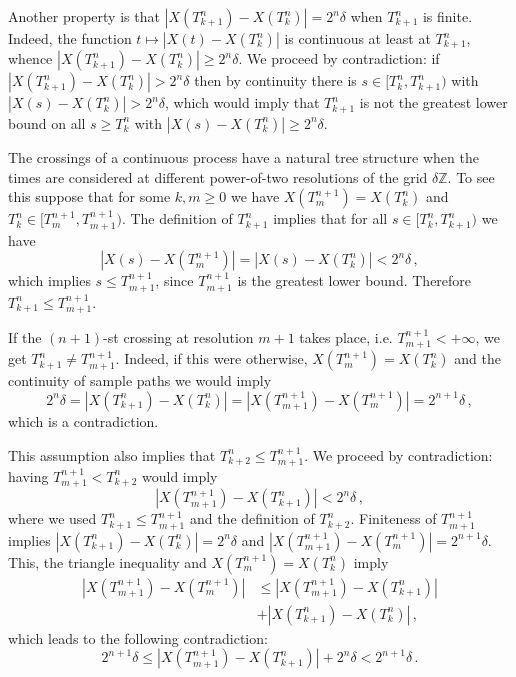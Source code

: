 \documentclass[a4paper]{article}
\begin{document}
Another property is that $|X(T_{k+1}^n) - X(T_k^n)| = 2^n\delta$ when $T_{k+1}^n$
is finite. Indeed, the function $t \mapsto |X(t) - X(T_k^n)|$ is continuous at least
at $T_{k+1}^n$, whence $|X(T_{k+1}^n) - X(T_k^n)| \geq 2^n\delta$. We proceed by
contradiction: if $|X(T_{k+1}^n) - X(T_k^n)| > 2^n\delta$ then by continuity there
is $s\in [T_k^n, T_{k+1}^n)$ with $|X(s) - X(T_k^n)| > 2^n\delta$, which would
imply that $T_{k+1}^n$ is not the greatest lower bound on all $s\geq T_k^n$ with
$|X(s)-X(T_k^n)| \geq 2^n\delta$.


The crossings of a continuous process have a natural tree structure when the times
are considered at different power-of-two resolutions of the grid $\delta \mathbb{Z}$.
To see this suppose that for some $k, m\geq 0$ we have $X(T_m^{n+1}) = X(T_k^n)$
and $T_k^n \in [T_m^{n+1}, T_{m+1}^{n+1})$. The definition of $T_{k+1}^n$ implies
that for all $s \in [T_k^n, T_{k+1}^n)$ we have
\begin{equation}\label{eq:xing_resol}
    |X(s) - X(T_m^{n+1})| = |X(s) - X(T_k^n)| < 2^n\delta \,,
\end{equation}
which implies $s \leq T_{m+1}^{n+1}$, since $T_{m+1}^{n+1}$ is the greatest lower bound.
Therefore $T_{k+1}^n\leq T_{m+1}^{n+1}$.

If the $(n+1)$-st crossing at resolution $m+1$ takes place, i.e. $T_{m+1}^{n+1} < +\infty$,
we get $T_{k+1}^n \neq T_{m+1}^{n+1}$. Indeed, if this were otherwise, $X(T_m^{n+1}) = X(T_k^n)$
and the continuity of sample paths we would imply
\begin{equation*} \label{eq:contrad_1}
    2^n\delta = |X(T_{k+1}^n) - X(T_k^n)|
    = |X(T_{m+1}^{n+1}) - X(T_m^{n+1})| = 2^{n+1} \delta\,,
\end{equation*}
which is a contradiction.

This assumption also implies that $T_{k+2}^n \leq T_{m+1}^{n+1}$. We proceed by
contradiction: having $T_{m+1}^{n+1} < T_{k+2}^n$ would imply
\begin{equation*} \label{eq:contrad_2}
    |X(T_{m+1}^{n+1}) - X(T_{k+1}^n)| < 2^n\delta \,,
\end{equation*}
where we used $T_{k+1}^n \leq T_{m+1}^{n+1}$ and the definition of $T_{k+2}^n$.
Finiteness of $T_{m+1}^{n+1}$ implies $|X(T_{k+1}^n) - X(T_k^n)| = 2^n \delta$
and $|X(T_{m+1}^{n+1}) - X(T_m^{n+1})| = 2^{n+1} \delta$. This, the triangle inequality
and $X(T_m^{n+1}) = X(T_k^n)$ imply
\begin{align*} \label{eq:xing_triang}
  |X(T_{m+1}^{n+1}) - X(T_m^{n+1})|
  &\leq |X(T_{m+1}^{n+1}) - X(T_{k+1}^n)| \\
    & + |X(T_{k+1}^n) - X(T_k^n)| \,,
\end{align*}
which leads to the following contradiction:
\begin{equation*} \label{eq:contrad_3}
  2^{n+1} \delta
    \leq |X(T_{m+1}^{n+1}) - X(T_{k+1}^n)| + 2^n\delta
    < 2^{n+1} \delta \,.
\end{equation*}
\end{document}
